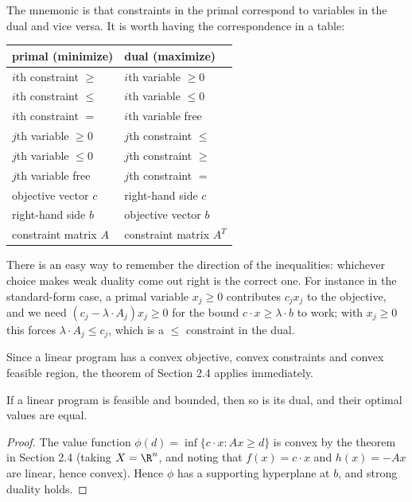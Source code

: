 The mnemonic is that constraints in the primal correspond to variables in the dual and vice versa. It is worth having the correspondence in a table:
\begin{center}
\begin{tabular}{l|l}
    primal (minimize) & dual (maximize)\\\hline
    $i$th constraint $\geq$ & $i$th variable $\geq 0$\\
    $i$th constraint $\leq$ & $i$th variable $\leq 0$\\
    $i$th constraint $=$ & $i$th variable free\\\hline
    $j$th variable $\geq 0$ & $j$th constraint $\leq$\\
    $j$th variable $\leq 0$ & $j$th constraint $\geq$\\
    $j$th variable free & $j$th constraint $=$\\\hline
    objective vector $c$ & right-hand side $c$\\
    right-hand side $b$ & objective vector $b$\\
    constraint matrix $A$ & constraint matrix $A^T$
\end{tabular}
\end{center}
There is an easy way to remember the direction of the inequalities: whichever choice makes weak duality come out right is the correct one. For instance in the standard-form case, a primal variable $x_j \geq 0$ contributes $c_jx_j$ to the objective, and we need $(c_j - \lambda\cdot A_j)x_j \geq 0$ for the bound $c\cdot x \geq \lambda\cdot b$ to work; with $x_j \geq 0$ this forces $\lambda\cdot A_j \leq c_j$, which is a $\leq$ constraint in the dual.

Since a linear program has a convex objective, convex constraints and convex feasible region, the theorem of Section 2.4 applies immediately.

\begin{theorem}
    If a linear program is feasible and bounded, then so is its dual, and their optimal values are equal.
\end{theorem}
\begin{proof}
    The value function $\phi(d) = \inf\{c\cdot x : Ax \geq d\}$ is convex by the theorem in Section 2.4 (taking $X = \R^n$, and noting that $f(x) = c\cdot x$ and $h(x) = -Ax$ are linear, hence convex). Hence $\phi$ has a supporting hyperplane at $b$, and strong duality holds.
\end{proof}

